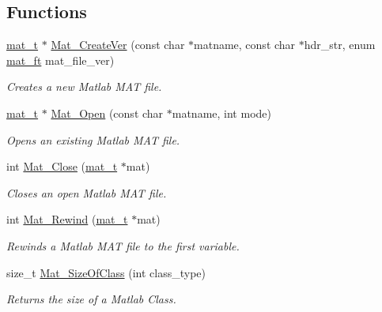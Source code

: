 \subsection*{Functions}
\begin{DoxyCompactItemize}
\item 
\hyperlink{struct__mat__t}{mat\_\-t} $\ast$ \hyperlink{group__MAT_ga22d404f203af7869c841400e7ad247cf}{Mat\_\-CreateVer} (const char $\ast$matname, const char $\ast$hdr\_\-str, enum \hyperlink{group__MAT_gad03442b8378999189d510e3745c702b7}{mat\_\-ft} mat\_\-file\_\-ver)
\begin{DoxyCompactList}\small\item\em Creates a new Matlab MAT file. \item\end{DoxyCompactList}\item 
\hyperlink{struct__mat__t}{mat\_\-t} $\ast$ \hyperlink{group__MAT_gafbfedb5636a99f0ef867520c47f77d18}{Mat\_\-Open} (const char $\ast$matname, int mode)
\begin{DoxyCompactList}\small\item\em Opens an existing Matlab MAT file. \item\end{DoxyCompactList}\item 
int \hyperlink{group__MAT_ga101c92ff7bde4a2d4615661beba09262}{Mat\_\-Close} (\hyperlink{struct__mat__t}{mat\_\-t} $\ast$mat)
\begin{DoxyCompactList}\small\item\em Closes an open Matlab MAT file. \item\end{DoxyCompactList}\item 
int \hyperlink{group__MAT_ga4d6e3892d2e216c507a744ba0e070d0b}{Mat\_\-Rewind} (\hyperlink{struct__mat__t}{mat\_\-t} $\ast$mat)
\begin{DoxyCompactList}\small\item\em Rewinds a Matlab MAT file to the first variable. \item\end{DoxyCompactList}\item 
size\_\-t \hyperlink{group__MAT_ga2bf682f015b22fa796a8885e997661e7}{Mat\_\-SizeOfClass} (int class\_\-type)
\begin{DoxyCompactList}\small\item\em Returns the size of a Matlab Class. \item\end{DoxyCompactList}\item 

\end{DoxyCompactItemize}
